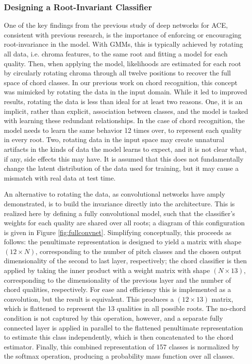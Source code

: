 \subsubsection{Designing a Root-Invariant Classifier}
\label{subsubsec:root_invariance}
One of the key findings from the previous study of deep networks for ACE, consistent with previous research, is the importance of enforcing or encouraging root-invariance in the model.
With GMMs, this is typically achieved by rotating all data, i.e. chroma features, to the same root and fitting a model for each quality.
Then, when applying the model, likelihoods are estimated for each root by circularly rotating chroma through all twelve positions to recover the full space of chord classes.
In our previous work on chord recognition, this concept was mimicked by rotating the data in the input domain.
While it led to improved results, rotating the data is less than ideal for at least two reasons.
One, it is an implicit, rather than explicit, association between classes, and the model is tasked with learning these redundant relationships.
In the case of chord recognition, the model needs to learn the same behavior 12 times over, to represent each quality in every root.
Two, rotating data in the input space may create unnatural artifacts in the kinds of data the model learns to expect, and it is not clear what, if any, side effects this may have.
It is assumed that this does not fundamentally change the latent distribution of the data used for training, but it may cause a mismatch with real data at test time.

An alternative to rotating the data, as convolutional networks have amply demonstrated, is to build the invariance directly into the architecture.
This is realized here by defining a fully convolutional model, such that the classifier's weights for each quality are shared over all roots; a diagram of this configuration is given in Figure \ref{fig:fullconvnet}.
Simplifying conceptually, this proceeds as follows: the penultimate representation is designed to yield a matrix with shape $(12 \times N)$, corresponding to the number of pitch classes and the chosen output dimensionality of the second to last layer, respectively; the chord classifier is then applied by taking the inner product with a weight matrix with shape $(N \times 13)$, corresponding to the dimensionality of the previous layer and the number of chord qualities, respectively.
For ease and efficiency this is implemented as a convolution, but the result is equivalent.
This produces a $(12 \times 13)$ matrix, which is flattened to represent the 13 qualities in all possible roots.
The no-chord condition is not captured by this operation, however, and a separate fully connected layer is applied in parallel to the flattened penultimate representation to estimate this class independently, which is then concatenated to the chord estimator.
Finally, this combined representation of 157 classes is normalized by the softmax operation, producing a probability mass function over all classes.

